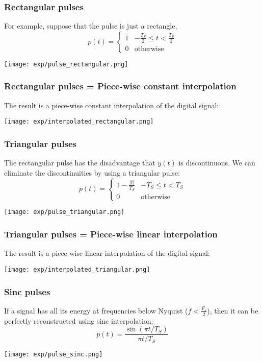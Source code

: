 \documentclass{beamer}
\begin{document}
\begin{frame}
  \frametitle{Rectangular pulses}

  For example, suppose that the pulse is  just a  rectangle,
  \begin{displaymath}
    p(t) = \begin{cases}
      1 & -\frac{T_S}{2}\le t<\frac{T_S}{2}\\
      0 & \mbox{otherwise}
    \end{cases}
  \end{displaymath}

  \centerline{\texttt{[image: exp/pulse\_rectangular.png]}}  
\end{frame}

\begin{frame}
  \frametitle{Rectangular pulses = Piece-wise constant interpolation}

  The result is a  piece-wise constant interpolation of the digital signal:

  \centerline{\texttt{[image: exp/interpolated\_rectangular.png]}}  
\end{frame}

\begin{frame}
  \frametitle{Triangular pulses}

  The rectangular pulse has the disadvantage that $y(t)$ is discontinuous.
  We can eliminate the discontinuities by using a triangular pulse:
  \begin{displaymath}
    p(t) = \begin{cases}
      1-\frac{|t|}{T_S} & -T_S\le t<T_S\\
      0 & \mbox{otherwise}
    \end{cases}
  \end{displaymath}

  \centerline{\texttt{[image: exp/pulse\_triangular.png]}}  
\end{frame}

\begin{frame}
  \frametitle{Triangular pulses = Piece-wise linear interpolation}

  The result is a  piece-wise linear interpolation of the digital signal:

  \centerline{\texttt{[image: exp/interpolated\_triangular.png]}}  
\end{frame}

\begin{frame}
  \frametitle{Sinc pulses}

  If a signal has all its energy at frequencies below Nyquist ($f< \frac{F_s}{2}$), then
  it can be perfectly reconstructed using sinc interpolation:
  \begin{displaymath}
    p(t) = \frac{\sin(\pi t/T_S)}{\pi t/T_S}
  \end{displaymath}

  \centerline{\texttt{[image: exp/pulse\_sinc.png]}}  
\end{frame}
\end{document}
